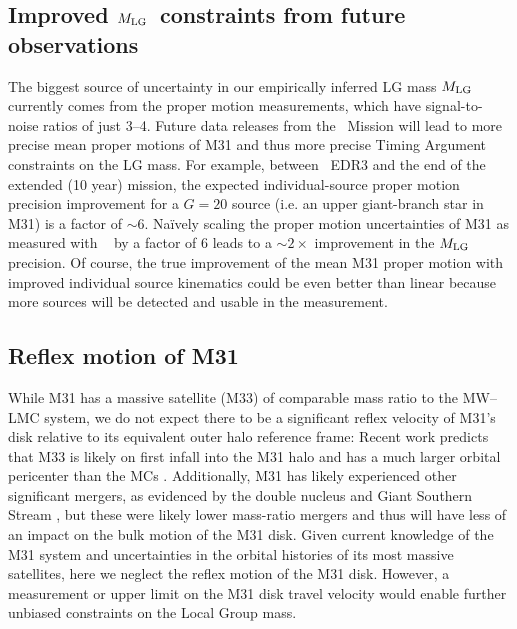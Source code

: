 \documentclass[twocolumn]{aastex631}
\newcommand{\mlg}{\ensuremath{M_{\rm LG}}}
\begin{document}
\subsection{Improved \mlg\ constraints from future observations}
\label{sec:discussion-futureobs}
The biggest source of uncertainty in our empirically inferred LG mass $\mlg$
currently comes from the proper motion measurements, which have signal-to-noise
ratios of just 3--4.
Future data releases from the \gaia\ Mission \citep{GaiaOverview2016} will lead
to more precise mean proper motions of M31 and thus more precise Timing Argument
constraints on the LG mass.
For example, between \gaia\ EDR3 and the end of the extended (10 year) mission,
the expected individual-source proper motion precision improvement for a $G=20$
source (i.e. an upper giant-branch star in M31) is a factor of $\sim$6.
Na\"ively scaling the proper motion uncertainties of M31 as measured with \gaia\
\citep{Salomon2021} by a factor of 6 leads to a $\sim2\times$ improvement in the
$\mlg$ precision.
Of course, the true improvement of the mean M31 proper motion with improved
individual source kinematics could be even better than linear because more
sources will be detected and usable in the measurement.


\subsection{Reflex motion of M31}
\label{sec:discussion-m31}
While M31 has a massive satellite (M33) of comparable mass ratio to the
MW--LMC system, we do not expect there to be a significant reflex
velocity of M31's disk relative to its equivalent outer halo reference frame:
Recent work predicts that M33 is likely on first infall into the M31 halo and
has a much larger orbital pericenter than the MCs \citep[e.g.,][]{Patel2017a}.
Additionally, M31 has likely experienced other significant mergers, as
evidenced by the double nucleus and Giant Southern Stream
\citep[e.g.][]{Ibata:2001, Font:2006}, but these were likely lower mass-ratio
mergers \citep[e.g.][]{Gilbert:2019, Milo:2022} and thus will have less of an
impact on the bulk motion of the M31 disk.
Given current knowledge of the M31 system and uncertainties in the orbital
histories of its most massive satellites, here we neglect the reflex motion of
the M31 disk.
However, a measurement or upper limit on the M31 disk travel velocity would
enable further unbiased constraints on the Local Group mass.
\end{document}

